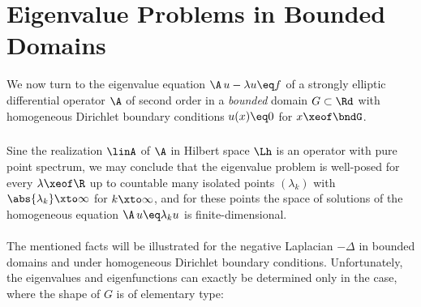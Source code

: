 \documentclass[11pt,twoside]{article}
\def\G{G}
\begin{document}
\section{Eigenvalue Problems in Bounded Domains}
We now turn to the eigenvalue equation $\A \, u  - \lambda u \eq f$
of a strongly elliptic differential operator $\A$ of second order
in a \textit{bounded} domain $\G \subset \Rd$
with homogeneous Dirichlet boundary conditions $u(x) \eq 0$ for $x \xeof \bndG$.

\subparagraph{}
Sine the realization $\linA$ of $\A$ in Hilbert space $\Lh$
is an operator with pure point spectrum,
we may conclude
that the eigenvalue problem is well-posed for every $\lambda \xeof \R$
up to countable many isolated points $(\lambda_k)$
with $\abs{\lambda_k} \xto \infty$ for $k \xto \infty$,
and for these points the space of solutions of the homogeneous equation
$\A \, u \eq \lambda_k u$ is finite-dimensional.

\paragraph{} %
The mentioned facts will be illustrated for the negative Laplacian $-\Delta$
in bounded domains and under homogeneous Dirichlet boundary conditions.
Unfortunately,
the eigenvalues and eigenfunctions can exactly be determined only in the case,
where the shape of $\G$ is of elementary type:
\end{document}
